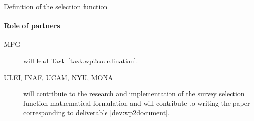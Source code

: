 \begin{workpackage}{Definition of the selection function}
\begin{wpdescription}
    \paragraph{Role of partners}
    \begin{description}
      \item[MPG] will lead Task~\ref{task:wp2coordination}.
      \item[ULEI, INAF, UCAM, NYU, MONA] will contribute to the research and implementation of the survey selection function mathematical formulation and will contribute to writing the paper corresponding to deliverable \ref{dev:wp2document}.
    \end{description}
  \end{wpdescription}

  \begin{wpdeliverables}
    \label{dev:wp2document}
  \end{wpdeliverables}

\end{workpackage}


